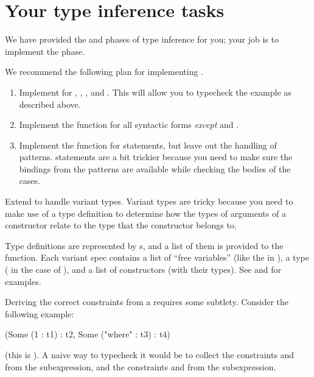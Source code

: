 \documentclass{pset}
\begin{document}
\section*{Your type inference tasks}

We have provided the  and  phases of type inference
for you; your job is to implement the  phase.


We recommend the following plan for implementing .

\begin{enumerate}
\item Implement  for , , , and
  .  This will allow you to typecheck the 
  example as described above.

\item Implement the  function for all syntactic forms
  \emph{except}  and .

\item Implement the  function for  statements, but
  leave out the handling of  patterns.   statements
  are a bit trickier because you need to make sure the bindings from the
  patterns are available while checking the bodies of the cases.
\end{enumerate}

Extend  to handle variant types.  Variant types are
tricky because you need to make use of a type definition to determine how the
types of arguments of a constructor relate to the type that the constructor
belongs to.

Type definitions are represented by s, and a list of
them is provided to the  function.  Each variant spec
contains a list  of ``free variables'' (like the  in
), a type  ( in the case of
), and a list of constructors (with their types).  See
 and  for examples.

Deriving the correct constraints from a  requires some
subtlety.  Consider the following example:
\begin{ocaml}
(Some (1 : t1) : t2, Some ("where" : t3) : t4)
\end{ocaml}
(this is ).  A naive way to typecheck it would be
to collect the constraints  and  from
the  subexpression, and the constraints  and
 from the  subexpression.
\end{document}
